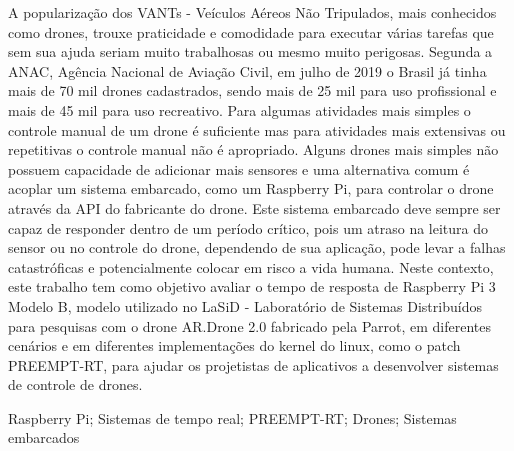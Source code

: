 \resumo
A popularização dos VANTs - Veículos Aéreos Não Tripulados, mais conhecidos como drones, trouxe praticidade e comodidade para executar várias tarefas que sem sua ajuda seriam muito trabalhosas ou mesmo muito perigosas. Segunda a ANAC, Agência Nacional de Aviação Civil, em julho de 2019 o Brasil já tinha mais de 70 mil drones cadastrados, sendo mais de 25 mil para uso profissional e mais de 45 mil para uso recreativo. Para algumas atividades mais simples o controle manual de um drone é suficiente mas para atividades mais extensivas ou repetitivas o controle manual não é apropriado. Alguns drones mais simples não possuem capacidade de adicionar mais sensores e uma alternativa comum é acoplar um sistema embarcado, como um Raspberry Pi, para controlar o drone através da API do fabricante do drone. Este sistema embarcado deve sempre ser capaz de responder dentro de um período crítico, pois um atraso na leitura do sensor ou no controle do drone, dependendo de sua aplicação, pode levar a falhas catastróficas e potencialmente colocar em risco a vida humana. Neste contexto, este trabalho tem como objetivo avaliar o tempo de resposta de Raspberry Pi 3 Modelo B, modelo utilizado no LaSiD - Laboratório de Sistemas Distribuídos para pesquisas com o drone AR.Drone 2.0 fabricado pela Parrot, em diferentes cenários e em diferentes implementações do kernel do linux, como o patch PREEMPT-RT, para ajudar os projetistas de aplicativos a desenvolver sistemas de controle de drones.

\begin{keywords}
Raspberry Pi; Sistemas de tempo real; PREEMPT-RT; Drones; Sistemas embarcados
\end{keywords}
